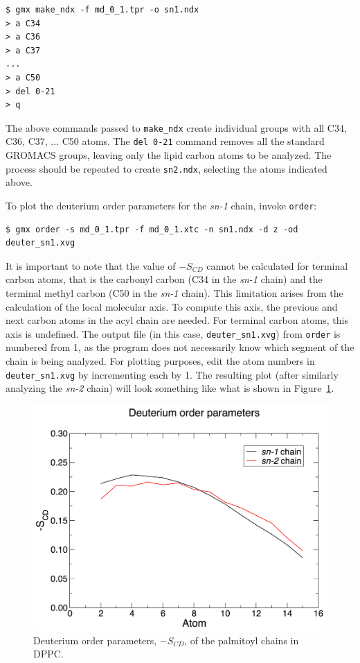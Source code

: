 \documentclass[9pt,tutorial,pubversion]{livecoms}
\begin{document}
\begin{lstlisting}
$ gmx make_ndx -f md_0_1.tpr -o sn1.ndx
> a C34
> a C36
> a C37
...
> a C50
> del 0-21
> q
\end{lstlisting}
%
The above commands passed to \texttt{make\_ndx} create individual groups with all C34, C36, C37, ... C50 atoms. The \texttt{del 0-21} command removes all the standard GROMACS groups, leaving only the lipid carbon atoms to be analyzed. The process should be repeated to create \texttt{sn2.ndx}, selecting the atoms indicated above.

To plot the deuterium order parameters for the {\em sn-1} chain, invoke \texttt{order}:

\begin{lstlisting}
$ gmx order -s md_0_1.tpr -f md_0_1.xtc -n sn1.ndx -d z -od deuter_sn1.xvg
\end{lstlisting}
%
It is important to note that the value of $-S_{CD}$ cannot be calculated for terminal carbon atoms, that is the carbonyl carbon (C34 in the {\em sn-1} chain) and the terminal methyl carbon (C50 in the {\em sn-1} chain). This limitation arises from the calculation of the local molecular axis. To compute this axis, the previous and next carbon atoms in the acyl chain are needed. For terminal carbon atoms, this axis is undefined. The output file (in this case, \texttt{deuter\_sn1.xvg}) from \texttt{order} is numbered from 1, as the program does not necessarily know which segment of the chain is being analyzed. For plotting purposes, edit the atom numbers in \texttt{deuter\_sn1.xvg} by incrementing each by 1. The resulting plot (after similarly analyzing the {\em sn-2} chain) will look something like what is shown in Figure~\ref{kalp_dppc_scd_fig}.

\begin{figure}[h!]
\centering
\includegraphics{plot_kalp_dppc_Scd}
\caption{Deuterium order parameters, $-S_{CD}$, of the palmitoyl chains in DPPC.}
\label{kalp_dppc_scd_fig}
\end{figure}
\end{document}
